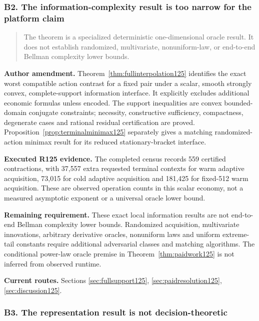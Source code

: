 \subsubsection{B2. The information-complexity result is too narrow for the platform claim}

\begin{quote}\small
The theorem is a specialized deterministic one-dimensional oracle result. It does not establish randomized, multivariate, nonuniform-law, or end-to-end Bellman complexity lower bounds.
\end{quote}

\noindent\textbf{Author amendment.} Theorem~\ref{thm:fullinterpolation125} identifies the exact worst compatible action contrast for a fixed pair under a scalar, smooth strongly convex, complete-support information interface. It explicitly excludes additional economic formulas unless encoded. The support inequalities are convex bounded-domain conjugate constraints; necessity, constructive sufficiency, compactness, degenerate cases and rational residual certification are proved. Proposition~\ref{prop:terminalminimax125} separately gives a matching randomized-action minimax result for its reduced stationary-bracket interface.

\noindent\textbf{Executed R125 evidence.} The completed census records 559 certified contractions, with 37,557 extra requested terminal contexts for warm adaptive acquisition, 73,015 for cold adaptive acquisition and 181,425 for fixed-512 warm acquisition. These are observed operation counts in this scalar economy, not a measured asymptotic exponent or a universal oracle lower bound.

\noindent\textbf{Remaining requirement.} These exact local information results are not end-to-end Bellman complexity lower bounds. Randomized acquisition, multivariate innovations, arbitrary derivative oracles, nonuniform laws and uniform extreme-tail constants require additional adversarial classes and matching algorithms. The conditional power-law oracle premise in Theorem~\ref{thm:paidwork125} is not inferred from observed runtime.

\noindent\textbf{Current routes.} Sections \ref{sec:fullsupport125}, \ref{sec:paidresolution125}, \ref{sec:discussion125}.

\subsubsection{B3. The representation result is not decision-theoretic}

